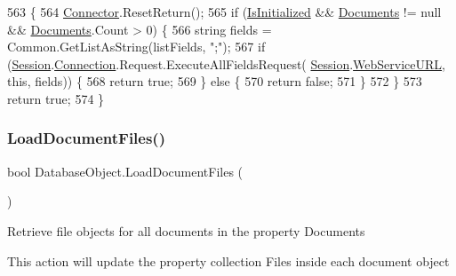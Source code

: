 \begin{DoxyCode}
563                                                      \{
564         \mbox{\hyperlink{class_connector}{Connector}}.ResetReturn();
565         \textcolor{keywordflow}{if} (\mbox{\hyperlink{class_database_object_a5fe036d32a30eb10d1b3f6a30263f740}{IsInitialized}} && \mbox{\hyperlink{class_database_object_afaf1159aa427c5bcce01c4b8c6f34514}{Documents}} != null && 
      \mbox{\hyperlink{class_database_object_afaf1159aa427c5bcce01c4b8c6f34514}{Documents}}.Count > 0) \{
566             \textcolor{keywordtype}{string} fields = Common.GetListAsString(listFields, \textcolor{stringliteral}{";"});
567             \textcolor{keywordflow}{if} (\mbox{\hyperlink{class_database_object_aa8484162b7d2a7c4c9426bca13c64c07}{Session}}.\mbox{\hyperlink{class_session_object_a014bdbf705a753540e19bfb53030c55c}{Connection}}.Request.ExecuteAllFieldsRequest(
      \mbox{\hyperlink{class_database_object_aa8484162b7d2a7c4c9426bca13c64c07}{Session}}.\mbox{\hyperlink{class_session_object_a697c071c812fbf7ad1166b896fb44c16}{WebServiceURL}}, \textcolor{keyword}{this}, fields)) \{
568                 \textcolor{keywordflow}{return} \textcolor{keyword}{true};
569             \} \textcolor{keywordflow}{else} \{
570                 \textcolor{keywordflow}{return} \textcolor{keyword}{false};
571             \}
572         \}
573         \textcolor{keywordflow}{return} \textcolor{keyword}{true};
574     \}
\end{DoxyCode}
\mbox{\label{class_database_object_acdf5c9ee898d4473350a2f4878af5a23}} 
\subsubsection{\texorpdfstring{Load\+Document\+Files()}{LoadDocumentFiles()}}
{\footnotesize\ttfamily bool Database\+Object.\+Load\+Document\+Files (\begin{DoxyParamCaption}{ }\end{DoxyParamCaption})}



Retrieve file objects for all documents in the property \textquotesingle{}Documents\textquotesingle{} 

This action will update the property collection Files inside each document object

